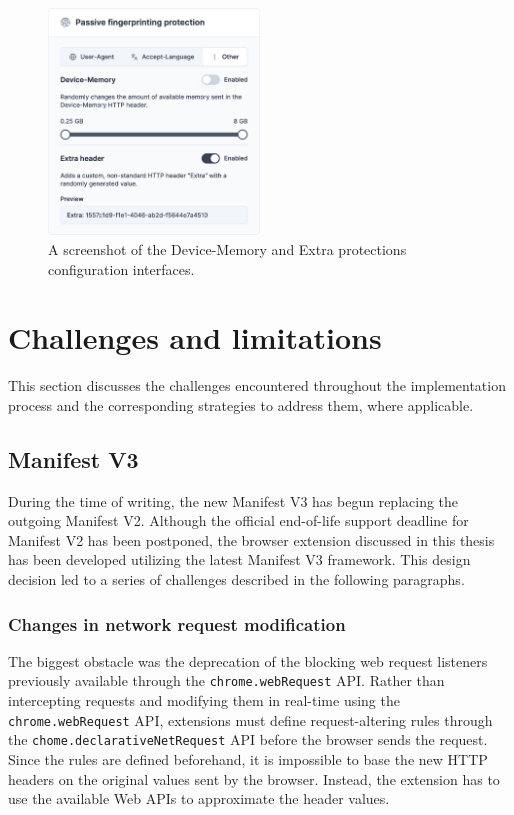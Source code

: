 \begin{figure}[H]
    \centering
    \includegraphics[width=0.5\textwidth]{obrazky-figures/screenshot-other}
    \caption{A screenshot of the Device-Memory and Extra protections configuration interfaces.}
\end{figure}

\section{Challenges and limitations}

This section discusses the challenges encountered throughout the implementation process and the corresponding strategies to address them, where applicable.

\subsection{Manifest V3}

During the time of writing, the new Manifest V3 has begun replacing the outgoing Manifest V2. Although the official end-of-life support deadline for Manifest V2 has been postponed, the browser extension discussed in this thesis has been developed utilizing the latest Manifest V3 framework. This design decision led to a series of challenges described in the following paragraphs.

\subsubsection{Changes in network request modification}

The biggest obstacle was the deprecation of the blocking web request listeners previously available through the \texttt{chrome.webRequest} API. Rather than intercepting requests and modifying them in real-time using the \texttt{chrome.webRequest} API, extensions must define request-altering rules through the \texttt{chome.declarativeNetRequest} API before the browser sends the request. Since the rules are defined beforehand, it is impossible to base the new HTTP headers on the original values sent by the browser. Instead, the extension has to use the available Web APIs to approximate the header values.

